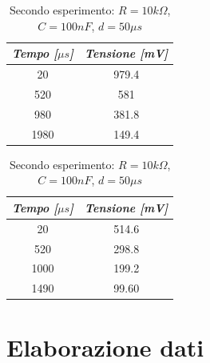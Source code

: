     \begin{table} [!htb]
        \begin{minipage}[c]{0.5\textwidth}
            \caption{Secondo esperimento: $R = 10k\Omega$,$C = 100nF$, $d=100\mu s$}
            \centering
            \begin{tabular}{|c|c|}
                \hline
                \textit{Tempo [$\mu s$]} & \textit{Tensione [mV]} \\
                \hline
                20 & 979.4 \\
                \hline
                520 & 581 \\
                \hline
                980 & 381.8 \\
                \hline
                1980 & 149.4 \\
                \hline
            \end{tabular}
        \end{minipage}
        \begin{minipage}[c]{0.5\textwidth}
            \caption{Secondo esperimento: $R = 10k\Omega$,$C = 100nF$, $d=50\mu s$}
            \centering
            \begin{tabular}{|c|c|}
                \hline
                \textit{Tempo [$\mu s$]} & \textit{Tensione [mV]} \\
                \hline
                20 & 514.6 \\
                \hline
                520 & 298.8 \\
                \hline
                1000 & 199.2 \\
                \hline
                1490 & 99.60 \\
                \hline
            \end{tabular}
        \end{minipage}
    \end{table}

    \section{Elaborazione dati}

